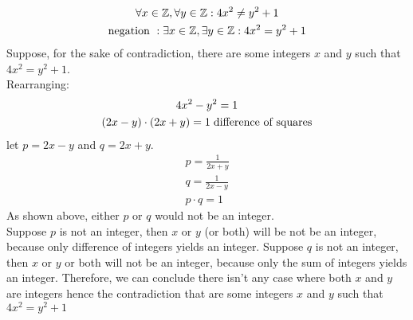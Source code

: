 \documentclass[11pt]{exam}
\begin{document}
\begin{parts}
\begin{customsolutionbox}
        \begin{gather}
            \forall x \in \mathbb{Z}, \forall y  \in \mathbb{Z}: 4x^{2}  \not = y^{2} + 1 \\
            \text{negation }: \exists x \in \mathbb{Z}, \exists y \in \mathbb{Z}: 4x^{2}  = y^{2} + 1
        \end{gather}
        Suppose, for the sake of contradiction, there are some integers $x$ and $y$ such that $4x^{2} = y^{2} + 1$. \\
        Rearranging:
        \begin{gather}
            4x^{2} - y^{2} = 1 \\
            (2x - y)\cdot(2x + y) = 1 \hspace{1.0mm} \text{difference of squares} \\
        \end{gather}
        let $p = 2x-y$ and $q = 2x+y$.
        \begin{gather}
            p = \frac{1}{2x+y}  \\
            q = \frac{1}{2x-y} \\
            p \cdot q = 1
        \end{gather}
        As shown above, either $p$ or $q$ would not be an integer. \\

        Suppose $p$ is not an integer, then $x$ or $y$ (or both) will be not be an integer, because only difference of integers yields an integer. Suppose $q$ is not an integer, then $x$ or $y$ or both will not be an integer, because only the sum of integers yields an integer. Therefore, we can conclude there isn't any case where both $x$ and $y$ are integers hence the contradiction that are some integers $x$ and $y$ such that $4x^{2}  = y^{2} + 1$
      \end{customsolutionbox}
\end{parts}
\end{document}
